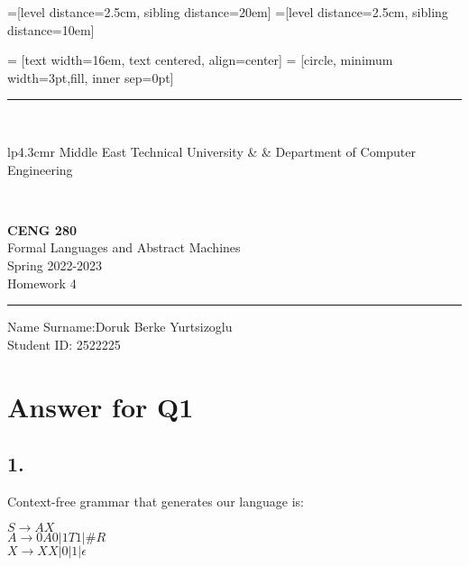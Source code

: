 \documentclass[12pt]{article}
\newcommand{\HRule}{\rule{\linewidth}{1mm}}
\begin{document}
=[level distance=2.5cm, sibling distance=20em]
=[level distance=2.5cm, sibling distance=10em]

 = [text width=16em, text centered, align=center]
 = [circle, minimum width=3pt,fill, inner sep=0pt]

\noindent
\HRule \\[3mm]
\small
\begin{tabular}[b]{lp{4.3cm}r}
Middle East Technical University &  &
Department of Computer Engineering \\
\end{tabular} \\
\begin{center}

                 \LARGE \textbf{CENG 280} \\[4mm]
                 \Large Formal Languages and Abstract Machines \\[4mm]
                \normalsize Spring 2022-2023 \\
                    \Large Homework 4 \\
\end{center}
\HRule



\begin{center}
Name Surname:Doruk Berke Yurtsizoglu   \\
Student ID: 2522225
\end{center}



\section*{Answer for Q1}

\subsection*{1.} 
Context-free grammar that generates our language is:\\
\begin{center}

$S \rightarrow AX$\\
$A \rightarrow 0A0 | 1T1 | \#R$\\
$X \rightarrow XX | 0 | 1 | \epsilon$\\



\end{center} 
\end{document}
